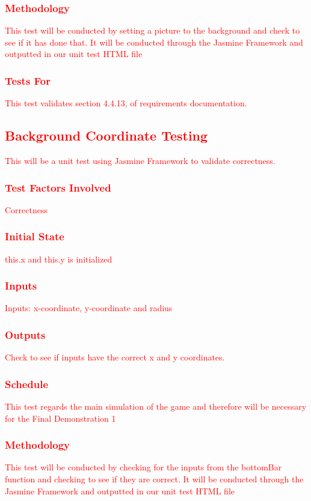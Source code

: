 \documentclass[11pt, oneside]{article}   	%
\begin{document}
\subsubsection{\textcolor{red}{Methodology}}
\textcolor{red}{This test will be conducted by setting a picture to the background and check to see if it has done that. It will be conducted through the Jasmine Framework and outputted in our unit test HTML file}
\subsubsection{\textcolor{red}{Tests For}}
\textcolor{red}{This test validates section 4.4.13, of requirements documentation.}



\subsection{\textcolor{red}{Background Coordinate Testing}}
\textcolor{red}{This will be a unit test using Jasmine Framework to validate correctness.}
\subsubsection{\textcolor{red}{Test Factors Involved}}
\textcolor{red}{Correctness}
\subsubsection{\textcolor{red}{Initial State}}
\textcolor{red}{this.x and this.y is initialized}
\subsubsection{\textcolor{red}{Inputs}}
\textcolor{red}{Inputs: x-coordinate, y-coordinate and radius}
\subsubsection{\textcolor{red}{Outputs}}
\textcolor{red}{Check to see if inputs have the correct x and y coordinates.}
\subsubsection{\textcolor{red}{Schedule}}
\textcolor{red}{This test regards the main simulation of the game and therefore will be necessary for the Final Demonstration 1}
\subsubsection{\textcolor{red}{Methodology}}
\textcolor{red}{This test will be conducted by checking for the inputs from the bottomBar function and checking to see if they are correct. It will be conducted through the Jasmine Framework and outputted in our unit test HTML file}
\end{document}
